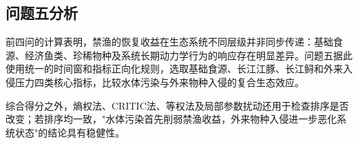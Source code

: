 \subsection{问题五分析}
前四问的计算表明，禁渔的恢复收益在生态系统不同层级并非同步传递：基础食源、经济鱼类、珍稀物种及系统长期动力学行为的响应存在明显差异。问题五据此使用统一的时间窗和指标正向化规则，选取基础食源、长江江豚、长江鲟和外来入侵压力四类核心指标，比较水体污染与外来物种入侵的复合生态效应。

综合得分之外，熵权法、CRITIC法、等权法及局部参数扰动还用于检查排序是否改变；若排序均一致，"水体污染首先削弱禁渔收益，外来物种入侵进一步恶化系统状态"的结论具有稳健性。

